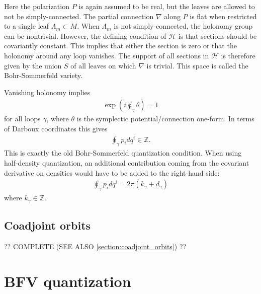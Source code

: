     \begin{method}
        Here the polarization $P$ is again assumed to be real, but the leaves are allowed to not be simply-connected. The partial connection $\nabla$ along $P$ is flat when restricted to a single leaf $\Lambda_m\subset M$. When $\Lambda_m$ is not simply-connected, the holonomy group can be nontrivial. However, the defining condition of $\mathcal{H}$ is that sections should be covariantly constant. This implies that either the section is zero or that the holonomy around any loop vanishes. The support of all sections in $\mathcal{H}$ is therefore given by the union $S$ of all leaves on which $\nabla$ is trivial. This space is called the Bohr-Sommerfeld variety.

        Vanishing holonomy implies
        \begin{gather}
            \exp\left(i\oint_\gamma\theta\right) = 1
        \end{gather}
        for all loops $\gamma$, where $\theta$ is the symplectic potential/connection one-form. In terms of Darboux coordinates this gives
        \begin{gather}
            \oint_\gamma p_idq^i\in\mathbb{Z}.
        \end{gather}
        This is exactly the old Bohr-Sommerfeld quantization condition. When using half-density quantization, an additional contribution coming from the covariant derivative on densities would have to be added to the right-hand side:
        \begin{gather}
            \oint_\gamma p_idq^i = 2\pi(k_\gamma + d_\gamma)
        \end{gather}
        where $k_\gamma\in\mathbb{Z}$.
    \end{method}

\subsection{Coadjoint orbits}

    ?? COMPLETE (SEE ALSO \ref{section:coadjoint_orbits}) ??

\section{BFV quantization}

